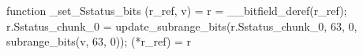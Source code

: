 function _set_Sstatus_bits (r_ref, v) = {
    r = __bitfield_deref(r_ref);
    r.Sstatus_chunk_0 = update_subrange_bits(r.Sstatus_chunk_0, 63, 0, subrange_bits(v, 63, 0));
    (*r_ref) = r
}
